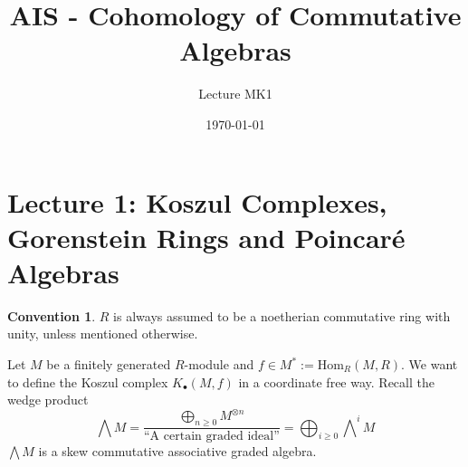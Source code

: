 \documentclass[oneside,11pt,reqno]{amsart}
\theoremstyle{definition}
\newtheorem{conv}[thm]{Convention}
\theoremstyle{remark}
\begin{document}
\title{AIS - Cohomology of Commutative Algebras}
\author{Lecture MK1}
\date{\today}
\maketitle

\section*{Lecture 1: {\color{Sepia} Koszul Complexes, Gorenstein Rings and Poincar\'{e} Algebras}}
\begin{conv} 
 $R$ is always assumed to be a noetherian commutative ring with unity, unless mentioned otherwise.
\end{conv}
Let $M$ be a finitely generated $R$-module and $f\in M^{*}:=\text{Hom}_R(M,R)$. We want to define the Koszul complex $K_{\bullet}(M,f)$ in a coordinate free way. Recall the wedge product
\begin{equation*}
	\bigwedge M = \frac{\bigoplus_{n \geqslant 0} M^{\otimes n}}{\text{``A certain graded ideal''} } = \bigoplus_{i\geqslant 0} \bigwedge \nolimits ^{i}M
\end{equation*}
$\bigwedge M$ is a skew commutative associative graded algebra. 
\end{document}
